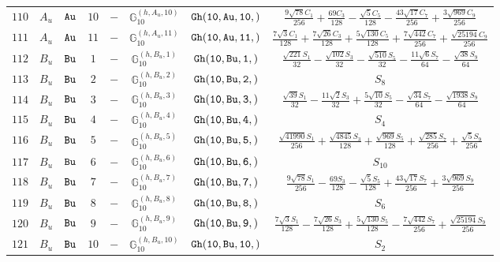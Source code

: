 \documentclass[fleqn,8pt]{jsarticle}
\begin{document}
\begin{table}[ht!]
\begin{center}
\begin{tabular}{cccccccc}
$ 110 $ & $ A_{u} $ & $ {\tt Au} $ & $ 10 $ & $ - $ & $ \mathbb{G}_{10}^{(h,A_{u},10)} $ & $ {\tt Gh(10,Au,10,)} $ & $ \frac{9 \sqrt{78} C_{1}}{256} + \frac{69 C_{3}}{128} - \frac{\sqrt{5} C_{5}}{128} - \frac{43 \sqrt{17} C_{7}}{256} + \frac{3 \sqrt{969} C_{9}}{256} $ \\
$ 111 $ & $ A_{u} $ & $ {\tt Au} $ & $ 11 $ & $ - $ & $ \mathbb{G}_{10}^{(h,A_{u},11)} $ & $ {\tt Gh(10,Au,11,)} $ & $ \frac{7 \sqrt{3} C_{1}}{128} + \frac{7 \sqrt{26} C_{3}}{128} + \frac{5 \sqrt{130} C_{5}}{128} + \frac{7 \sqrt{442} C_{7}}{256} + \frac{\sqrt{25194} C_{9}}{256} $ \\
$ 112 $ & $ B_{u} $ & $ {\tt Bu} $ & $ 1 $ & $ - $ & $ \mathbb{G}_{10}^{(h,B_{u},1)} $ & $ {\tt Gh(10,Bu,1,)} $ & $ \frac{\sqrt{221} S_{1}}{32} - \frac{\sqrt{102} S_{3}}{32} - \frac{\sqrt{510} S_{5}}{32} - \frac{11 \sqrt{6} S_{7}}{64} - \frac{\sqrt{38} S_{9}}{64} $ \\
$ 113 $ & $ B_{u} $ & $ {\tt Bu} $ & $ 2 $ & $ - $ & $ \mathbb{G}_{10}^{(h,B_{u},2)} $ & $ {\tt Gh(10,Bu,2,)} $ & $ S_{8} $ \\
$ 114 $ & $ B_{u} $ & $ {\tt Bu} $ & $ 3 $ & $ - $ & $ \mathbb{G}_{10}^{(h,B_{u},3)} $ & $ {\tt Gh(10,Bu,3,)} $ & $ \frac{\sqrt{39} S_{1}}{32} - \frac{11 \sqrt{2} S_{3}}{32} + \frac{5 \sqrt{10} S_{5}}{32} - \frac{\sqrt{34} S_{7}}{64} - \frac{\sqrt{1938} S_{9}}{64} $ \\
$ 115 $ & $ B_{u} $ & $ {\tt Bu} $ & $ 4 $ & $ - $ & $ \mathbb{G}_{10}^{(h,B_{u},4)} $ & $ {\tt Gh(10,Bu,4,)} $ & $ S_{4} $ \\
$ 116 $ & $ B_{u} $ & $ {\tt Bu} $ & $ 5 $ & $ - $ & $ \mathbb{G}_{10}^{(h,B_{u},5)} $ & $ {\tt Gh(10,Bu,5,)} $ & $ \frac{\sqrt{41990} S_{1}}{256} + \frac{\sqrt{4845} S_{3}}{128} + \frac{\sqrt{969} S_{5}}{128} + \frac{\sqrt{285} S_{7}}{256} + \frac{\sqrt{5} S_{9}}{256} $ \\
$ 117 $ & $ B_{u} $ & $ {\tt Bu} $ & $ 6 $ & $ - $ & $ \mathbb{G}_{10}^{(h,B_{u},6)} $ & $ {\tt Gh(10,Bu,6,)} $ & $ S_{10} $ \\
$ 118 $ & $ B_{u} $ & $ {\tt Bu} $ & $ 7 $ & $ - $ & $ \mathbb{G}_{10}^{(h,B_{u},7)} $ & $ {\tt Gh(10,Bu,7,)} $ & $ \frac{9 \sqrt{78} S_{1}}{256} - \frac{69 S_{3}}{128} - \frac{\sqrt{5} S_{5}}{128} + \frac{43 \sqrt{17} S_{7}}{256} + \frac{3 \sqrt{969} S_{9}}{256} $ \\
$ 119 $ & $ B_{u} $ & $ {\tt Bu} $ & $ 8 $ & $ - $ & $ \mathbb{G}_{10}^{(h,B_{u},8)} $ & $ {\tt Gh(10,Bu,8,)} $ & $ S_{6} $ \\
$ 120 $ & $ B_{u} $ & $ {\tt Bu} $ & $ 9 $ & $ - $ & $ \mathbb{G}_{10}^{(h,B_{u},9)} $ & $ {\tt Gh(10,Bu,9,)} $ & $ \frac{7 \sqrt{3} S_{1}}{128} - \frac{7 \sqrt{26} S_{3}}{128} + \frac{5 \sqrt{130} S_{5}}{128} - \frac{7 \sqrt{442} S_{7}}{256} + \frac{\sqrt{25194} S_{9}}{256} $ \\
$ 121 $ & $ B_{u} $ & $ {\tt Bu} $ & $ 10 $ & $ - $ & $ \mathbb{G}_{10}^{(h,B_{u},10)} $ & $ {\tt Gh(10,Bu,10,)} $ & $ S_{2} $ \\
 \hline \hline
\end{tabular}
\end{center}
\end{table}
\end{document}
